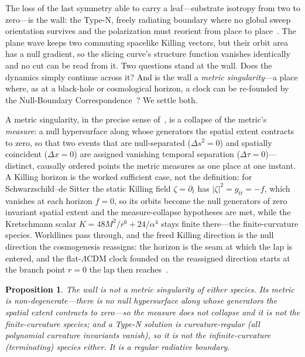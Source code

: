 \documentclass[11pt,a4paper]{article}
\theoremstyle{plain}
\newtheorem{proposition}{Proposition}
\theoremstyle{definition}
\theoremstyle{remark}
\begin{document}
The loss of the last symmetry able to carry a leaf---substrate isotropy from two to zero---is the wall: the Type-N, freely radiating boundary where no global sweep orientation survives and the polarization must reorient from place to place~\cite{JanzenRange}. The plane wave keeps two commuting spacelike Killing vectors, but their orbit area has a null gradient, so the slicing curve's structure function vanishes identically and no cut can be read from it. Two questions stand at the wall. Does the dynamics simply continue across it? And is the wall a \emph{metric singularity}---a place where, as at a black-hole or cosmological horizon, a clock can be re-founded by the Null-Boundary Correspondence~\cite{JanzenBHcausality,JanzenCRframework}? We settle both.

A metric singularity, in the precise sense of~\cite{JanzenBHcausality}, is a collapse of the metric's \emph{measure}: a null hypersurface along whose generators the spatial extent contracts to zero, so that two events that are null-separated ($\Delta s^2=0$) and spatially coincident ($\Delta x=0$) are assigned vanishing temporal separation ($\Delta\tau=0$)---distinct, causally ordered points the metric measures as one place at one instant. A Killing horizon is the worked sufficient case, not the definition: for Schwarzschild--de Sitter the static Killing field $\zeta=\partial_t$ has $|\zeta|^2=g_{tt}=-f$, which vanishes at each horizon $f=0$, so its orbits become the null generators of zero invariant spatial extent and the measure-collapse hypotheses are met, while the Kretschmann scalar $K=48M^2/r^6+24/\alpha^4$ stays finite there---the finite-curvature species. Worldlines pass through, and the freed Killing direction is the null direction the cosmogenesis reassigns: the horizon is the seam at which the lap is entered, and the flat-$\Lambda$CDM clock founded on the reassigned direction starts at the branch point $r=0$ the lap then reaches~\cite{JanzenCRframework}.

\begin{proposition}\label{prop:radiative-wall}
The wall is not a metric singularity of either species. Its metric is non-degenerate---there is no null hypersurface along whose generators the spatial extent contracts to zero---so the measure does not collapse and it is not the finite-curvature species; and a Type-N solution is curvature-regular (all polynomial curvature invariants vanish), so it is not the infinite-curvature (terminating) species either. It is a regular radiative boundary.
\end{proposition}
\end{document}
